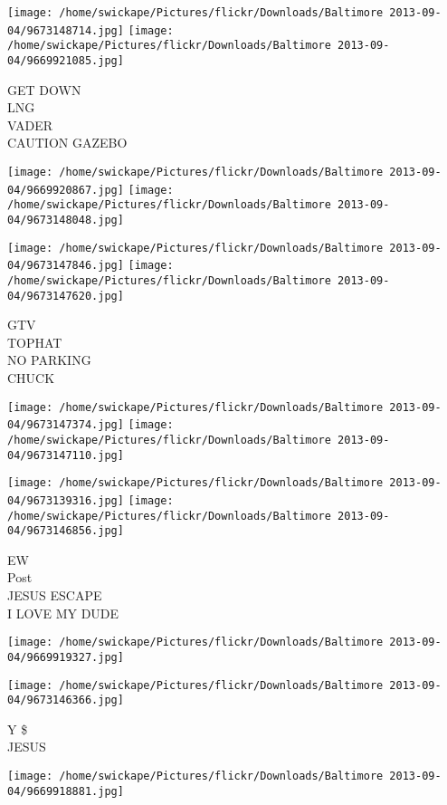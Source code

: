 \documentclass[10pt,letterpaper]{article}
\begin{document}
\texttt{[image: /home/swickape/Pictures/flickr/Downloads/Baltimore 2013-09-04/9673148714.jpg]}
\texttt{[image: /home/swickape/Pictures/flickr/Downloads/Baltimore 2013-09-04/9669921085.jpg]}

GET DOWN\\
LNG\\
VADER\\
CAUTION GAZEBO\\
\pagebreak

\texttt{[image: /home/swickape/Pictures/flickr/Downloads/Baltimore 2013-09-04/9669920867.jpg]}
\texttt{[image: /home/swickape/Pictures/flickr/Downloads/Baltimore 2013-09-04/9673148048.jpg]}

\texttt{[image: /home/swickape/Pictures/flickr/Downloads/Baltimore 2013-09-04/9673147846.jpg]}
\texttt{[image: /home/swickape/Pictures/flickr/Downloads/Baltimore 2013-09-04/9673147620.jpg]}

GTV\\
TOPHAT\\
NO PARKING\\
CHUCK\\
\pagebreak

\texttt{[image: /home/swickape/Pictures/flickr/Downloads/Baltimore 2013-09-04/9673147374.jpg]}
\texttt{[image: /home/swickape/Pictures/flickr/Downloads/Baltimore 2013-09-04/9673147110.jpg]}

\texttt{[image: /home/swickape/Pictures/flickr/Downloads/Baltimore 2013-09-04/9673139316.jpg]}
\texttt{[image: /home/swickape/Pictures/flickr/Downloads/Baltimore 2013-09-04/9673146856.jpg]}

EW\\
Post\\
JESUS ESCAPE\\
I LOVE MY DUDE\\
\pagebreak

\texttt{[image: /home/swickape/Pictures/flickr/Downloads/Baltimore 2013-09-04/9669919327.jpg]}

\vspace{0.25in}
\texttt{[image: /home/swickape/Pictures/flickr/Downloads/Baltimore 2013-09-04/9673146366.jpg]}

Y \$\\
JESUS\\
\pagebreak

\texttt{[image: /home/swickape/Pictures/flickr/Downloads/Baltimore 2013-09-04/9669918881.jpg]}
\end{document}
